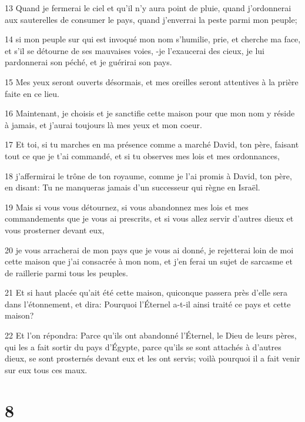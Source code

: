 \par 13 Quand je fermerai le ciel et qu'il n'y aura point de pluie, quand j'ordonnerai aux sauterelles de consumer le pays, quand j'enverrai la peste parmi mon peuple;
\par 14 si mon peuple sur qui est invoqué mon nom s'humilie, prie, et cherche ma face, et s'il se détourne de ses mauvaises voies, -je l'exaucerai des cieux, je lui pardonnerai son péché, et je guérirai son pays.
\par 15 Mes yeux seront ouverts désormais, et mes oreilles seront attentives à la prière faite en ce lieu.
\par 16 Maintenant, je choisis et je sanctifie cette maison pour que mon nom y réside à jamais, et j'aurai toujours là mes yeux et mon coeur.
\par 17 Et toi, si tu marches en ma présence comme a marché David, ton père, faisant tout ce que je t'ai commandé, et si tu observes mes lois et mes ordonnances,
\par 18 j'affermirai le trône de ton royaume, comme je l'ai promis à David, ton père, en disant: Tu ne manqueras jamais d'un successeur qui règne en Israël.
\par 19 Mais si vous vous détournez, si vous abandonnez mes lois et mes commandements que je vous ai prescrits, et si vous allez servir d'autres dieux et vous prosterner devant eux,
\par 20 je vous arracherai de mon pays que je vous ai donné, je rejetterai loin de moi cette maison que j'ai consacrée à mon nom, et j'en ferai un sujet de sarcasme et de raillerie parmi tous les peuples.
\par 21 Et si haut placée qu'ait été cette maison, quiconque passera près d'elle sera dans l'étonnement, et dira: Pourquoi l'Éternel a-t-il ainsi traité ce pays et cette maison?
\par 22 Et l'on répondra: Parce qu'ils ont abandonné l'Éternel, le Dieu de leurs pères, qui les a fait sortir du pays d'Égypte, parce qu'ils se sont attachés à d'autres dieux, se sont prosternés devant eux et les ont servis; voilà pourquoi il a fait venir sur eux tous ces maux.

\chapter{8}

